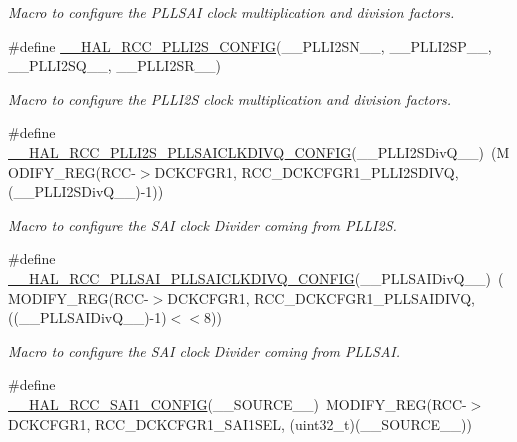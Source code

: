 \begin{DoxyCompactItemize}
\begin{DoxyCompactList}\small\item\em Macro to configure the P\+L\+L\+S\+AI clock multiplication and division factors. \end{DoxyCompactList}\item 
\#define \mbox{\hyperlink{group___r_c_c_ex___exported___macros_ga9aafdab89de4a330a682731e28e535eb}{\+\_\+\+\_\+\+H\+A\+L\+\_\+\+R\+C\+C\+\_\+\+P\+L\+L\+I2\+S\+\_\+\+C\+O\+N\+F\+IG}}(\+\_\+\+\_\+\+P\+L\+L\+I2\+S\+N\+\_\+\+\_\+,  \+\_\+\+\_\+\+P\+L\+L\+I2\+S\+P\+\_\+\+\_\+,  \+\_\+\+\_\+\+P\+L\+L\+I2\+S\+Q\+\_\+\+\_\+,  \+\_\+\+\_\+\+P\+L\+L\+I2\+S\+R\+\_\+\+\_\+)
\begin{DoxyCompactList}\small\item\em Macro to configure the P\+L\+L\+I2S clock multiplication and division factors. \end{DoxyCompactList}\item 
\#define \mbox{\hyperlink{group___r_c_c_ex___exported___macros_gafc7cf4dd4c7859bcefe0d46cc56426bb}{\+\_\+\+\_\+\+H\+A\+L\+\_\+\+R\+C\+C\+\_\+\+P\+L\+L\+I2\+S\+\_\+\+P\+L\+L\+S\+A\+I\+C\+L\+K\+D\+I\+V\+Q\+\_\+\+C\+O\+N\+F\+IG}}(\+\_\+\+\_\+\+P\+L\+L\+I2\+S\+Div\+Q\+\_\+\+\_\+)~(M\+O\+D\+I\+F\+Y\+\_\+\+R\+EG(R\+CC-\/$>$D\+C\+K\+C\+F\+G\+R1, R\+C\+C\+\_\+\+D\+C\+K\+C\+F\+G\+R1\+\_\+\+P\+L\+L\+I2\+S\+D\+I\+VQ, (\+\_\+\+\_\+\+P\+L\+L\+I2\+S\+Div\+Q\+\_\+\+\_\+)-\/1))
\begin{DoxyCompactList}\small\item\em Macro to configure the S\+AI clock Divider coming from P\+L\+L\+I2S. \end{DoxyCompactList}\item 
\#define \mbox{\hyperlink{group___r_c_c_ex___exported___macros_gad4fc19bc8f6c50dca02f9d0b14fc41fd}{\+\_\+\+\_\+\+H\+A\+L\+\_\+\+R\+C\+C\+\_\+\+P\+L\+L\+S\+A\+I\+\_\+\+P\+L\+L\+S\+A\+I\+C\+L\+K\+D\+I\+V\+Q\+\_\+\+C\+O\+N\+F\+IG}}(\+\_\+\+\_\+\+P\+L\+L\+S\+A\+I\+Div\+Q\+\_\+\+\_\+)~(M\+O\+D\+I\+F\+Y\+\_\+\+R\+EG(R\+CC-\/$>$D\+C\+K\+C\+F\+G\+R1, R\+C\+C\+\_\+\+D\+C\+K\+C\+F\+G\+R1\+\_\+\+P\+L\+L\+S\+A\+I\+D\+I\+VQ, ((\+\_\+\+\_\+\+P\+L\+L\+S\+A\+I\+Div\+Q\+\_\+\+\_\+)-\/1)$<$$<$8))
\begin{DoxyCompactList}\small\item\em Macro to configure the S\+AI clock Divider coming from P\+L\+L\+S\+AI. \end{DoxyCompactList}\item 
\#define \mbox{\hyperlink{group___r_c_c_ex___exported___macros_ga57c7909a2eb8ee312705c224607d00c6}{\+\_\+\+\_\+\+H\+A\+L\+\_\+\+R\+C\+C\+\_\+\+S\+A\+I1\+\_\+\+C\+O\+N\+F\+IG}}(\+\_\+\+\_\+\+S\+O\+U\+R\+C\+E\+\_\+\+\_\+)~M\+O\+D\+I\+F\+Y\+\_\+\+R\+EG(R\+CC-\/$>$D\+C\+K\+C\+F\+G\+R1, R\+C\+C\+\_\+\+D\+C\+K\+C\+F\+G\+R1\+\_\+\+S\+A\+I1\+S\+EL, (uint32\+\_\+t)(\+\_\+\+\_\+\+S\+O\+U\+R\+C\+E\+\_\+\+\_\+))
$$
\end{DoxyCompactItemize}
